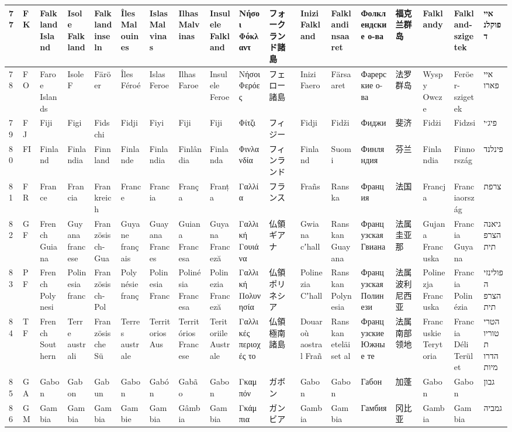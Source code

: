 \begin{longtable}{|l|l|l|l|l|l|l|l|l|l|l|l|l|l|l|l|l|l|}
77 & FK & Falkland Island & Isole Falkland & Falklandinseln & Îles Malouines & Islas Malvinas & Ilhas Malvinas & Insulele Falkland & Νήσοι Φόκλαντ & フォークランド諸島 & Inizi Falkland & Falklandinsaaret & Фолклендские о-ва & 福克兰群岛 & Falklandy & Falkland-szigetek & איי פוקלנד \\ \hline 
78 & FO & Faroe Islands & Isole F & Färöer & Îles Féroé & Islas Feroe & Ilhas Faroe & Insulele Feroe & Νήσοι Φερόες & フェロー諸島 & Inizi Faero & Färsaaret & Фарерские о-ва & 法罗群岛 & Wyspy Owcze & Feröer-szigetek & איי פארו \\ \hline 
79 & FJ & Fiji & Figi & Fidschi & Fidji & Fiyi & Fiji & Fiji & Φίτζι & フィジー & Fidji & Fidži & Фиджи & 斐济 & Fidżi & Fidzsi & פיג׳י \\ \hline 
80 & FI & Finland & Finlandia & Finnland & Finlande & Finlandia & Finlândia & Finlanda & Φινλανδία & フィンランド & Finland & Suomi & Финляндия & 芬兰 & Finlandia & Finnország & פינלנד \\ \hline 
81 & FR & France & Francia & Frankreich & France & Francia & França & Franța & Γαλλία & フランス & Frañs & Ranska & Франция & 法国 & Francja & Franciaország & צרפת \\ \hline 
82 & GF & French Guiana & Guyana francese & Französisch-Gua & Guyane français & Guayana Frances & Guiana Francesa & Guyana Franceză & Γαλλική Γουιάνα & 仏領ギアナ & Gwiana cʼhall & Ranskan Guayana & Французская Гвиана & 法属圭亚那 & Gujana Francuska & Francia Guyana & גיאנה הצרפתית \\ \hline 
83 & PF & French Polynesi & Polinesia franc & Französisch-Pol & Polynésie franç & Polinesia Franc & Polinésia Francesa & Polinezia Franceză & Γαλλική Πολυνησία & 仏領ポリネシア & Polinezia Cʼhall & Ranskan Polynesia & Французская Полинези & 法属波利尼西亚 & Polinezja Francuska & Francia Polinézia & פולינזיה הצרפתית \\ \hline 
84 & TF & French Southern & Terre australi  & Französische Sü & Terres australe & Territorios Aus & Territórios Francese & Teritoriile Australe & Γαλλικές περιοχές το & 仏領極南諸島 & Douaroù aostral Frañ & Ranskan eteläiset al & Французские Южные те & 法属南部领地 & Francuskie Terytoria & Francia Déli Terület & הטריטוריות הדרומיות  \\ \hline 
85 & GA & Gabon & Gabon & Gabun & Gabon & Gabón & Gabão & Gabon & Γκαμπόν & ガボン & Gabon & Gabon & Габон & 加蓬 & Gabon & Gabon & גבון \\ \hline 
86 & GM & Gambia & Gambia & Gambia & Gambie & Gambia & Gâmbia & Gambia & Γκάμπια & ガンビア & Gambia & Gambia & Гамбия & 冈比亚 & Gambia & Gambia & גמביה \\ \hline 

\end{longtable}
